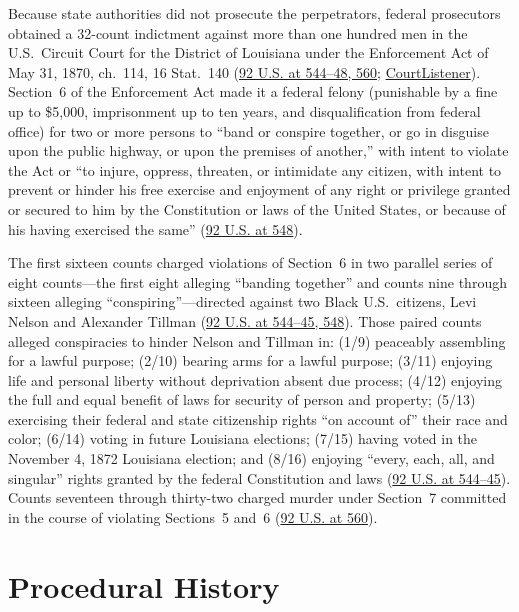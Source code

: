 \documentclass[12pt]{article}
\begin{document}
Because state authorities did not prosecute the perpetrators, federal prosecutors obtained a 32-count indictment against more than one hundred men in the U.S.~Circuit Court for the District of Louisiana under the Enforcement Act of May 31, 1870, ch.~114, 16 Stat.~140 (\href{https://supreme.justia.com/cases/federal/us/92/542/}{92 U.S. at 544--48, 560}; \href{https://www.courtlistener.com/opinion/89309/united-states-v-cruikshank/}{CourtListener}). Section~6 of the Enforcement Act made it a federal felony (punishable by a fine up to \$5,000, imprisonment up to ten years, and disqualification from federal office) for two or more persons to ``band or conspire together, or go in disguise upon the public highway, or upon the premises of another,'' with intent to violate the Act or ``to injure, oppress, threaten, or intimidate any citizen, with intent to prevent or hinder his free exercise and enjoyment of any right or privilege granted or secured to him by the Constitution or laws of the United States, or because of his having exercised the same'' (\href{https://supreme.justia.com/cases/federal/us/92/542/}{92 U.S. at 548}).

The first sixteen counts charged violations of Section~6 in two parallel series of eight counts---the first eight alleging ``banding together'' and counts nine through sixteen alleging ``conspiring''---directed against two Black U.S.~citizens, Levi Nelson and Alexander Tillman (\href{https://supreme.justia.com/cases/federal/us/92/542/}{92 U.S. at 544--45, 548}). Those paired counts alleged conspiracies to hinder Nelson and Tillman in: (1/9) peaceably assembling for a lawful purpose; (2/10) bearing arms for a lawful purpose; (3/11) enjoying life and personal liberty without deprivation absent due process; (4/12) enjoying the full and equal benefit of laws for security of person and property; (5/13) exercising their federal and state citizenship rights ``on account of'' their race and color; (6/14) voting in future Louisiana elections; (7/15) having voted in the November 4, 1872 Louisiana election; and (8/16) enjoying ``every, each, all, and singular'' rights granted by the federal Constitution and laws (\href{https://supreme.justia.com/cases/federal/us/92/542/}{92 U.S. at 544--45}). Counts seventeen through thirty-two charged murder under Section~7 committed in the course of violating Sections~5 and~6 (\href{https://supreme.justia.com/cases/federal/us/92/542/}{92 U.S. at 560}).

\section{Procedural History}
\end{document}
